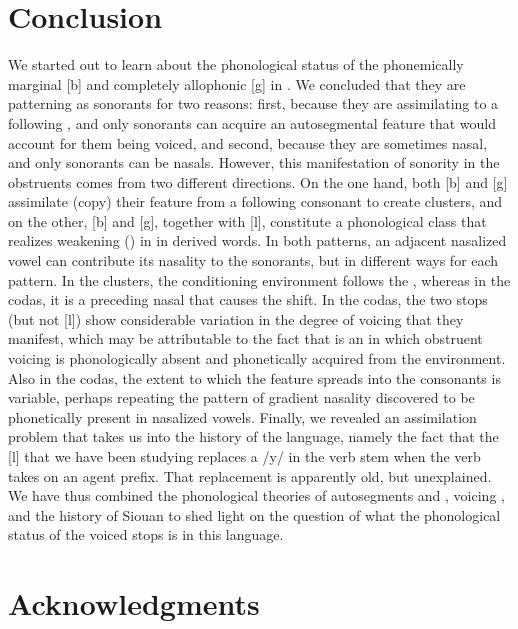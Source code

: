 \documentclass[output=paper]{LSP/langsci}
\begin{document}
\section{Conclusion}

We started out to learn about the phonological status of the phonemically marginal [b] and completely allophonic [g] in . We concluded that they are patterning as sonorants for two reasons: first, because they are assimilating to a following , and only sonorants can acquire an autosegmental feature that would account for them being voiced, and second, because they are sometimes nasal, and only sonorants can be nasals. However, this manifestation of sonority in the obstruents comes from two different directions. On the one hand, both [b] and [g] assimilate (copy) their  feature from a following consonant to create clusters, and on the other, [b] and [g], together with [l], constitute a phonological class that realizes weakening () in  in derived words. In both patterns, an adjacent nasalized vowel can contribute its nasality to the sonorants, but in different ways for each pattern. In the clusters, the conditioning environment follows the , whereas in the codas, it is a preceding nasal that causes the shift. In the codas, the two stops (but not [l]) show considerable variation in the degree of voicing that they manifest, which may be attributable to the fact that  is an  in which obstruent voicing is phonologically absent and phonetically acquired from the environment. Also in the codas, the extent to which the  feature spreads into the consonants is variable, perhaps repeating the pattern of gradient nasality discovered to be phonetically present in nasalized vowels. Finally, we revealed an assimilation problem that takes us into the history of the language, namely the fact that the [l] that we have been studying replaces a /y/ in the verb stem when the verb takes on an agent prefix. That replacement is apparently old, but unexplained.
We have thus combined the phonological theories of autosegments and , voicing , and the history of Siouan to shed light on the question of what the phonological status of the voiced stops is in this language.

\section*{Acknowledgments}
\end{document}
